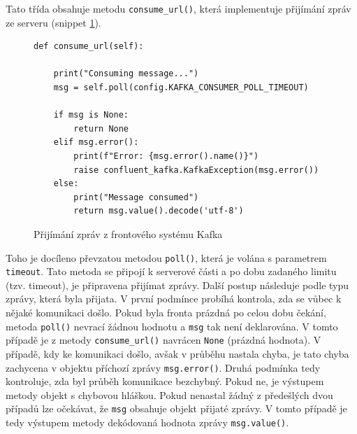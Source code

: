 \documentclass[thesis=M,czech,hidelinks]{FITthesis}[2013/05/06]
\begin{document}
Tato třída obsahuje metodu \texttt{consume_url()}, která implementuje přijímání zpráv ze serveru (snippet \ref{snip:kafkapoll}).
\begin{figure}[h]               
	\begin{verbatim}
def consume_url(self):
	
    print("Consuming message...")
    msg = self.poll(config.KAFKA_CONSUMER_POLL_TIMEOUT)
	
    if msg is None:
        return None
    elif msg.error():
        print(f"Error: {msg.error().name()}")
        raise confluent_kafka.KafkaException(msg.error())
    else:
        print("Message consumed")
        return msg.value().decode('utf-8')
	\end{verbatim}      
	\caption{Přijímání zpráv z frontového systému Kafka}
	\label{snip:kafkapoll}
\end{figure}
Toho je docíleno převzatou metodou \texttt{poll()}, která je volána s parametrem \texttt{timeout}. Tato metoda se připojí k serverové části a po dobu zadaného limitu (tzv. timeout), je připravena přijímat zprávy. Další postup následuje podle typu zprávy, která byla přijata. V první podmínce probíhá kontrola, zda se vůbec k nějaké komunikaci došlo. Pokud byla fronta prázdná po celou dobu čekání, metoda \texttt{poll()} nevrací žádnou hodnotu a \texttt{msg} tak není deklarována. V tomto případě je z metody \texttt{consume_url()} navrácen \texttt{None} (prázdná hodnota). V případě, kdy ke komunikaci došlo, avšak v průběhu nastala chyba, je tato chyba zachycena v objektu příchozí zprávy \texttt{msg.error()}. Druhá podmínka tedy kontroluje, zda byl průběh komunikace bezchybný. Pokud ne, je výstupem metody objekt s chybovou hláškou. Pokud nenastal žádný z předešlých dvou případů lze očekávat, že \texttt{msg} obsahuje objekt přijaté zprávy. V tomto případě je tedy výstupem metody dekódovaná hodnota zprávy \texttt{msg.value()}. 
\end{document}

